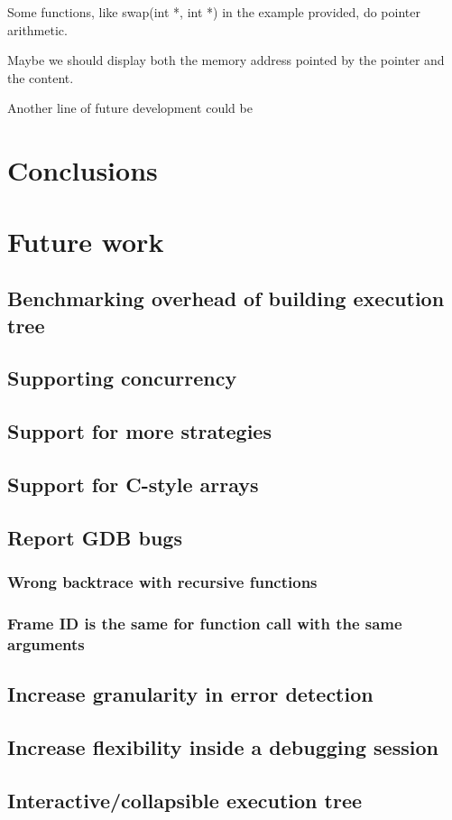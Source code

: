 Some functions, like swap(int *, int *) in the example provided, do pointer arithmetic.

Maybe we should display both the memory address pointed by the pointer and the content.

Another line of future development could be 

\section{Conclusions}
\section{Future work}
\subsection{Benchmarking overhead of building execution tree}
\subsection{Supporting concurrency}
\subsection{Support for more strategies}
\subsection{Support for C-style arrays}
\subsection{Report GDB bugs}
\subsubsection{Wrong backtrace with recursive functions}
\subsubsection{Frame ID is the same for function call with the same arguments}
\subsection{Increase granularity in error detection}
\subsection{Increase flexibility inside a debugging session}
\subsection{Interactive/collapsible execution tree}